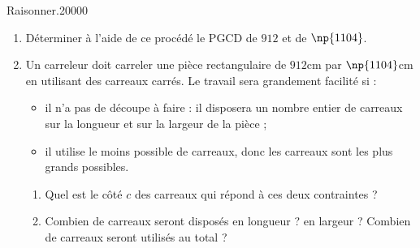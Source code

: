 \begin{pageAuto}
\begin{ExoAutoN}{Raisonner.}{2}{0}{0}{0}{0}
\begin{enumerate}[leftmargin=*]
\item Déterminer à l'aide de ce procédé le PGCD de $912$ et de $\np{1104}$. 
\item 
  Un carreleur doit carreler une pièce rectangulaire de $912$cm par
  $\np{1104}$cm
  en utilisant des carreaux carrés. Le travail sera grandement facilité
  si :
  \begin{itemize}
  \item il n'a pas de découpe à faire : il disposera un nombre entier
    de carreaux sur la longueur et sur la largeur de la pièce ;
  \item il utilise le moins possible de carreaux, donc les carreaux
    sont les plus grands possibles.
    
  \end{itemize}
  \begin{enumerate}
  \item Quel est le côté $c$ des carreaux qui répond à ces deux contraintes ?
  \item Combien de carreaux seront disposés en longueur ? en largeur ?
    Combien de carreaux seront utilisés au total ?
  \end{enumerate}
\end{enumerate}
\end{ExoAutoN}

\end{pageAuto}


